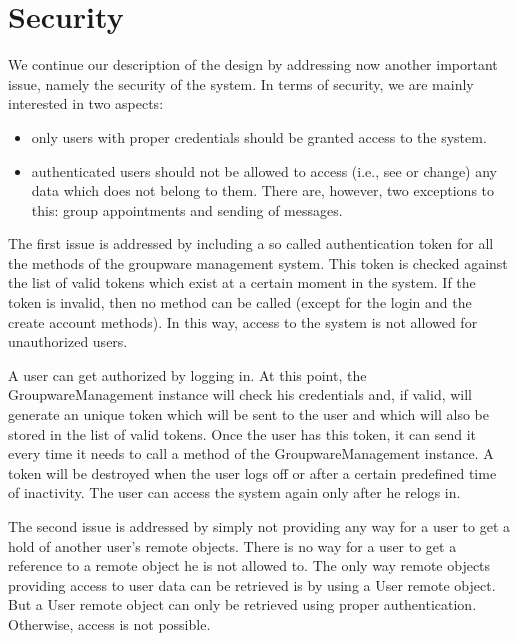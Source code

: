 \documentclass[a4paper,10pt]{article}
\begin{document}
\section{Security}
\label{sec:security}

We continue our description of the design by addressing now another important issue,
namely the security of the system. In terms of security, we are mainly interested in two
aspects:

\begin{itemize}

\item only users with proper credentials should be granted access to the system.

\item authenticated users should not be allowed to access (i.e., see or change) any data
which does not belong to them. There are, however, two exceptions to this: group
appointments and sending of messages.

\end{itemize}

The first issue is addressed by including a so called authentication token for all the
methods of the groupware management system. This token is checked against the list
of valid tokens which exist at a certain moment in the system. If the token is invalid,
then no method can be called (except for the login and the create account methods).
In this way, access to the system is not allowed for unauthorized users.

A user can get authorized by logging in. At this point, the GroupwareManagement instance
will check his credentials and, if valid, will generate an unique token which will be sent
to the user and which will also be stored in the list of valid tokens. Once the user has
this token, it can send it every time it needs to call a method of the GroupwareManagement
instance. A token will be destroyed when the user logs off or after a certain predefined
time of inactivity. The user can access the system again only after he relogs in.

The second issue is addressed by simply not providing any way for a user to get a hold
of another user's remote objects. There is no way for a user to get a reference to a remote
object he is not allowed to. The only way remote objects providing access to user data
can be retrieved is by using a User remote object. But a User remote object can only be
retrieved using proper authentication. Otherwise, access is not possible.
\end{document}
